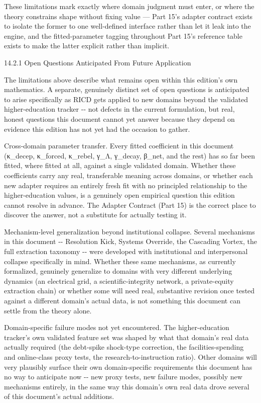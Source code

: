 \documentclass[
]{article}
\begin{document}
These limitations mark exactly where domain judgment must enter, or
where the theory constrains shape without fixing value --- Part 15's
adapter contract exists to isolate the former to one well-defined
interface rather than let it leak into the engine, and the
fitted-parameter tagging throughout Part 15's reference table exists to
make the latter explicit rather than implicit.

14.2.1 Open Questions Anticipated From Future Application

The limitations above describe what remains open within this edition's
own mathematics. A separate, genuinely distinct set of open questions is
anticipated to arise specifically as RICD gets applied to new domains
beyond the validated higher-education tracker -\/- not defects in the
current formulation, but real, honest questions this document cannot yet
answer because they depend on evidence this edition has not yet had the
occasion to gather.

Cross-domain parameter transfer. Every fitted coefficient in this
document (κ\_decep, κ\_forced, κ\_rebel, γ\_Λ, γ\_decay, β\_net, and the
rest) has so far been fitted, where fitted at all, against a single
validated domain. Whether these coefficients carry any real,
transferable meaning across domains, or whether each new adapter
requires an entirely fresh fit with no principled relationship to the
higher-education values, is a genuinely open empirical question this
edition cannot resolve in advance. The Adapter Contract (Part 15) is the
correct place to discover the answer, not a substitute for actually
testing it.

Mechanism-level generalization beyond institutional collapse. Several
mechanisms in this document -\/- Resolution Kick, Systems Override, the
Cascading Vortex, the full extraction taxonomy -\/- were developed with
institutional and interpersonal collapse specifically in mind. Whether
these same mechanisms, as currently formalized, genuinely generalize to
domains with very different underlying dynamics (an electrical grid, a
scientific-integrity network, a private-equity extraction chain) or
whether some will need real, substantive revision once tested against a
different domain's actual data, is not something this document can settle
from the theory alone.

Domain-specific failure modes not yet encountered. The higher-education
tracker's own validated feature set was shaped by what that domain's real
data actually required (the debt-spike shock-type correction, the
facilities-spending and online-class proxy tests, the
research-to-instruction ratio). Other domains will very plausibly
surface their own domain-specific requirements this document has no way
to anticipate now -\/- new proxy tests, new failure modes, possibly new
mechanisms entirely, in the same way this domain's own real data drove
several of this document's actual additions.
\end{document}

